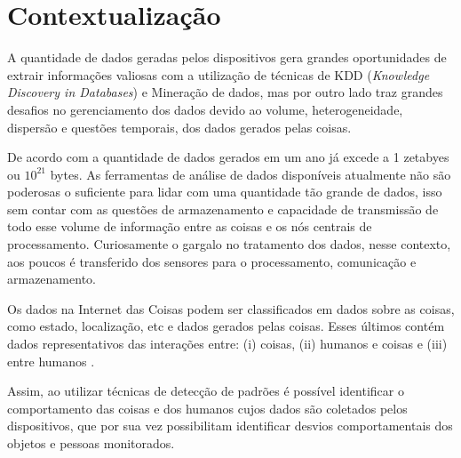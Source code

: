%

\section{Contextualização} \label{sec:context}

A quantidade de dados geradas pelos dispositivos gera grandes oportunidades de extrair informações valiosas com a utilização de técnicas de KDD (\textit{Knowledge Discovery in Databases}) e Mineração de dados, mas por outro lado traz grandes desafios no gerenciamento dos dados devido ao volume, heterogeneidade, dispersão e questões temporais, dos dados gerados pelas coisas.

De acordo com \cite{000-000} a quantidade de dados gerados em um ano já excede a 1 zetabyes ou $10^{21}$ bytes. As ferramentas de análise de dados disponíveis atualmente não são poderosas o suficiente para lidar com uma quantidade tão grande de dados, isso sem contar com as questões de armazenamento e capacidade de transmissão de todo esse volume de informação entre as coisas e os nós centrais de processamento. Curiosamente o gargalo no tratamento dos dados, nesse contexto, aos poucos é transferido dos sensores para o processamento, comunicação e armazenamento.

Os dados na Internet das Coisas podem ser classificados em dados sobre as coisas, como estado, localização, etc e dados gerados pelas coisas. Esses últimos contém dados representativos das interações entre: (i) coisas, (ii) humanos e coisas e (iii) entre humanos \cite{000-018}. 

Assim, ao utilizar técnicas de detecção de padrões é possível identificar o comportamento das coisas e dos humanos cujos dados são coletados pelos dispositivos, que por sua vez possibilitam identificar desvios comportamentais dos objetos e pessoas monitorados. 

